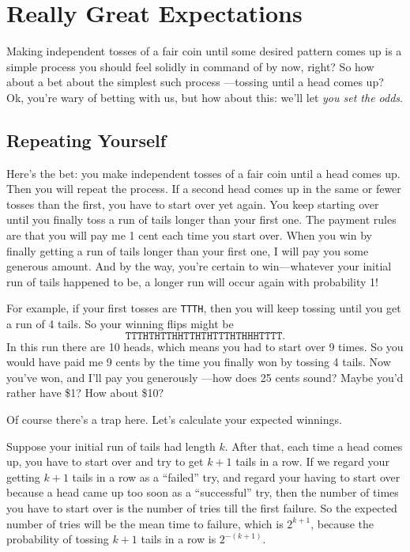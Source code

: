 \section{Really Great Expectations}\label{infinite_expect_sec}

Making independent tosses of a fair coin until some desired pattern
comes up is a simple process you should feel solidly in command of by
now, right?  So how about a bet about the simplest such process
---tossing until a head comes up?  Ok, you're wary of betting with us,
but how about this: we'll let \emph{you set the odds}.

\subsection{Repeating Yourself}
Here's the bet: you make independent tosses of a fair coin until a
head comes up.  Then you will repeat the process.  If a second head
comes up in the same or fewer tosses than the first, you have to start
over yet again.  You keep starting over until you finally toss a run
of tails longer than your first one.  The payment rules are that you
will pay me 1 cent each time you start over.  When you win by finally
getting a run of tails longer than your first one, I will pay you some
generous amount.  And by the way, you're certain to win---whatever
your initial run of tails happened to be, a longer run will occur
again with probability 1!

For example, if your first tosses are \texttt{TTTH}, then you will
keep tossing until you get a run of 4 tails.  So your winning
flips might be
\[
\texttt{TTTHTHTTHHTTHTHTTTHTHHHTTTT}.
\]
In this run there are 10 heads, which means you had to start over 9
times.  So you would have paid me 9 cents by the time you finally won
by tossing 4 tails.  Now you've won, and I'll pay you generously
---how does 25 cents sound?  Maybe you'd rather have \$1?  How about
\$10?

Of course there's a trap here.  Let's calculate your expected
winnings.

Suppose your initial run of tails had length $k$.  After that, each
time a head comes up, you have to start over and try to get $k+1$ tails
in a row.  If we regard your getting $k+1$ tails in a row as a
``failed'' try, and regard your having to start over because a head
came up too soon as a ``successful'' try, then the number of times you
have to start over is the number of tries till the first failure.  So
the expected number of tries will be the mean time to failure, which is
$2^{k+1}$, because the probability of tossing $k+1$ tails in a row is
$2^{-(k+1)}$.

